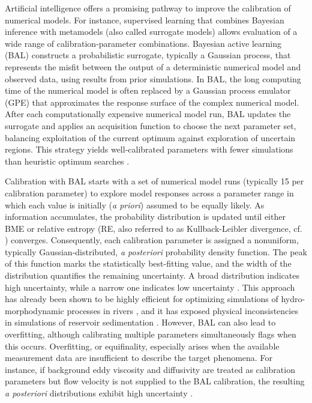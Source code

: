 \documentclass[draft,linenumbers,onecolumn]{agujournal2019} %
\begin{document}
Artificial intelligence offers a promising pathway to improve the calibration of numerical models. For instance, supervised learning that combines Bayesian inference with metamodels (also called surrogate models) allows evaluation of a wide range of calibration-parameter combinations. Bayesian active learning (BAL) constructs a probabilistic surrogate, typically a Gaussian process, that represents the misfit between the output of a deterministic numerical model and observed data, using results from prior simulations. In BAL, the long computing time of the numerical model is often replaced by a Gaussian process emulator (GPE) that approximates the response surface of the complex numerical model. After each computationally expensive numerical model run, BAL updates the surrogate and applies an acquisition function to choose the next parameter set, balancing exploitation of the current optimum against exploration of uncertain regions. This strategy yields well-calibrated parameters with fewer simulations than heuristic optimum searches \cite{oladyshkin2020bayesian3,rasmussen2006gaussian}. 

Calibration with BAL starts with a set of numerical model runs (typically 15 per calibration parameter) to explore model responses across a parameter range in which each value is initially (\textit{a priori}) assumed to be equally likely. As information accumulates, the probability distribution is updated until either BME or relative entropy (RE, also referred to as Kullback-Leibler divergence, cf. ) converges. Consequently, each calibration parameter is assigned a nonuniform, typically Gaussian-distributed, \textit{a posteriori} probability density function. The peak of this function marks the statistically best-fitting value, and the width of the distribution quantifies the remaining uncertainty. A broad distribution indicates high uncertainty, while a narrow one indicates low uncertainty \cite{oladyshkin2020bayesian3}. This approach has already been shown to be highly efficient for optimizing simulations of hydro-morphodynamic processes in rivers \cite{beckers2020bayesian}, and it has exposed physical inconsistencies in simulations of reservoir sedimentation \cite{mouris2023stability}. However, BAL can also lead to overfitting, although calibrating multiple parameters simultaneously flags when this occurs. Overfitting, or equifinality, especially arises when the available measurement data are insufficient to describe the target phenomena. For instance, if background eddy viscosity and diffusivity are treated as calibration parameters but flow velocity is not supplied to the BAL calibration, the resulting \textit{a posteriori} distributions exhibit high uncertainty \cite{schwindt2023bayesian}.
\end{document}
